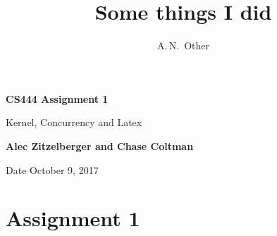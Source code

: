 \documentclass[letterpaper,10pt,fleqn]{article}
\author{A.\,N.~Other}
\title{Some things I did}
\begin{document}
\begin{titlepage}
    \begin{center}
        \vspace*{1cm}
        
        \textbf{CS444 Assignment 1}
        
        \vspace{0.5cm}
        Kernel, Concurrency and Latex
        
        \vspace{1.5cm}
        
        \textbf{Alec Zitzelberger and Chase Coltman}
        
        \vfill
        
       
        
        \vspace{0.8cm}
        
        
        
        Date October 9, 2017
        
    \end{center}
\end{titlepage}

\section* {Assignment 1}
\end{document}

